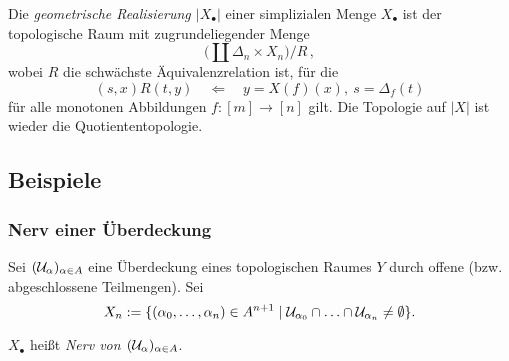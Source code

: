 \begin{definition}
  Die \emph{geometrische Realisierung $|X_\bullet|$} einer simplizialen Menge
  $X_\bullet$ ist der topologische Raum mit zugrundeliegender Menge
  \[ \big( \coprod \Delta_n \times X_n \big) \big/ R\,,\]
  wobei $R$ die schwächste Äquivalenzrelation ist, für die
  \[ (s,x) R (t,y) \quad\Longleftarrow\quad
    y = X(f)(x),\ s = \Delta_f(t)\]
  für alle monotonen Abbildungen $f:[m]\to [n]$ gilt. Die Topologie auf $|X|$ ist
  wieder die Quotiententopologie.
\end{definition}

\subsection{Beispiele}
\subsubsection{Nerv einer Überdeckung}

Sei $(\mathcal{U}_\alpha)_{\alpha \in A}$ eine Überdeckung eines topologischen Raumes
$Y$ durch offene (bzw. abgeschlossene Teilmengen). Sei
\[ X_n := \{ (\alpha_0, \ldots, \alpha_n) \in A^{n+1} \mid 
  \mathcal{U}_{\alpha_0} \cap \ldots \cap \mathcal{U}_{\alpha_n} \neq \emptyset \}.\]

\begin{definition}
  $X_\bullet$ heißt \emph{Nerv von $(\mathcal{U}_\alpha)_{\alpha\in A}$}.
\end{definition}

